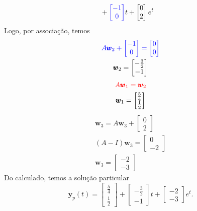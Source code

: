 \begin{ex}
\begin{align}
                 &+ {\color{blue}\begin{bmatrix}
                     -1\\
                     0
                 \end{bmatrix}}t +
                 \begin{bmatrix}
                   0 \\
                   2
                 \end{bmatrix}e^{t}
  \end{align}
  Logo, por associação, temos
  \begin{gather}
    {\color{blue}A\pmb{w}_2 + \begin{bmatrix}
        -1 \\
        0
      \end{bmatrix}  =
      \begin{bmatrix}
        0\\
        0
    \end{bmatrix}}
    \\
    \pmb{w}_2 =
    \begin{bmatrix}
      -\frac{3}{2} \\
      -1
    \end{bmatrix}
  \end{gather}
  \begin{gather}
    {\color{red}A\pmb{w}_1 = \pmb{w}_2}\\
    \pmb{w}_1 =
    \begin{bmatrix}
      \frac{5}{4} \\
      \frac{1}{2}
    \end{bmatrix}
  \end{gather}
  \begin{gather}
    \pmb{w}_3 = A\pmb{w}_3 +
    \begin{bmatrix}
      0 \\
      2
    \end{bmatrix}\\
    (A-I)\pmb{w}_3 =
    \begin{bmatrix}
      0 \\
      -2
    \end{bmatrix} \\
    \pmb{w}_3 =
    \begin{bmatrix}
      -2 \\
      -3
    \end{bmatrix}
  \end{gather}
  Do calculado, temos a solução particular
  \begin{equation}
    \pmb{y}_p(t) =   \begin{bmatrix}
      \frac{5}{4} \\
      \frac{1}{2}
    \end{bmatrix} +   \begin{bmatrix}
      -\frac{3}{2} \\
      -1
    \end{bmatrix}t +   \begin{bmatrix}
      -2 \\
      -3
    \end{bmatrix}e^t.
  \end{equation}


\end{ex}
